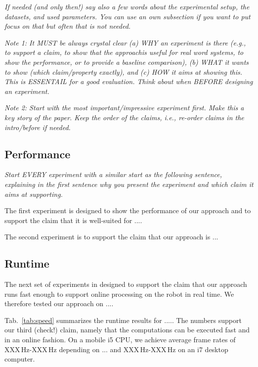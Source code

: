 \documentclass[letterpaper, 10 pt, conference]{ieeeconf}  %
\def\tabref#1{Tab.~\ref{#1}}
\begin{document}
\emph{If needed (and only then!) say also a few words about the
  experimental setup, the datasets, and used parameters. You can use
  an own subsection if you want to put focus on that but often that is
  not needed.}

\emph{Note 1: It MUST be always crystal clear (a) WHY an experiment is
  there (e.g., to support a claim, to show that the approachis useful
  for real word systems, to show the performance, or to provide a
  baseline comparison), (b) WHAT it wants to show (which
  claim/property exactly), and (c) HOW it aims at showing this. This
  is ESSENTAIL for a good evaluation. Think about when BEFORE
  designing an experiment.}

\emph{Note 2: Start with the most important/impressive experiment
  first. Make this a key story of the paper. Keep the order of the
  claims, i.e., re-order claims in the intro/before if needed. }

\subsection{Performance}

\emph{Start EVERY experiment with a similar start as the following
  sentence, explaining in the first sentence why you present the
  experiment and which claim it aims at supporting.}

The first experiment is designed to show the performance of our
approach and to support the claim that it is well-suited for ....


The second experiment is to support the claim that our approach is ...

\subsection{Runtime}

The next set of experiments in designed to support the claim that our
approach runs fast enough to support online processing on the robot in
real time. We therefore tested our approach on ....

\tabref{tab:speed} summarizes the runtime results for .....  The
numbers support our third (check!) claim, namely that the computations
can be executed fast and in an online fashion.  On a mobile i5 CPU, we
achieve average frame rates of XXX\,Hz-XXX\,Hz depending on ... and
XXX\,Hz-XXX\,Hz on an i7 desktop computer.
 
\end{document}
